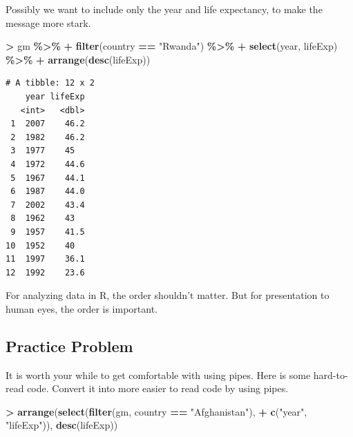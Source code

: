 \documentclass[
]{krantz}
\makeatletter
\newenvironment{Shaded}{\begin{snugshade}}{\end{snugshade}}
\newcommand{\KeywordTok}[1]{\textcolor[rgb]{0.27,0.27,0.27}{\textbf{#1}}}
\newcommand{\NormalTok}[1]{#1}
\newcommand{\OperatorTok}[1]{\textcolor[rgb]{0.43,0.43,0.43}{\textbf{#1}}}
\newcommand{\StringTok}[1]{\textcolor[rgb]{0.5,0.5,0.5}{#1}}
\newenvironment{kframe}{%
\medskip{}
\setlength{\fboxsep}{.8em}
 \def\at@end@of@kframe{}%
 \ifinner\ifhmode%
  \def\at@end@of@kframe{\end{minipage}}%
  \begin{minipage}{\columnwidth}%
 \fi\fi%
 \def\FrameCommand##1{\hskip\@totalleftmargin \hskip-\fboxsep
 \colorbox{shadecolor}{##1}\hskip-\fboxsep
     \hskip-\linewidth \hskip-\@totalleftmargin \hskip\columnwidth}%
 \MakeFramed {\advance\hsize-\width
   \@totalleftmargin\z@ \linewidth\hsize
   \@setminipage}}%
 {\par\unskip\endMakeFramed%
 \at@end@of@kframe}
\renewenvironment{Shaded}{\begin{kframe}}{\end{kframe}}
\makeatother
\begin{document}
Possibly we want to include only the year and life expectancy, to make the message more stark.

\begin{Shaded}
\begin{Highlighting}[]
\OperatorTok{\textgreater{}}\StringTok{ }\NormalTok{gm }\OperatorTok{\%\textgreater{}\%}\StringTok{ }
\OperatorTok{+}\StringTok{   }\KeywordTok{filter}\NormalTok{(country }\OperatorTok{==}\StringTok{ "Rwanda"}\NormalTok{) }\OperatorTok{\%\textgreater{}\%}\StringTok{ }
\OperatorTok{+}\StringTok{   }\KeywordTok{select}\NormalTok{(year, lifeExp) }\OperatorTok{\%\textgreater{}\%}\StringTok{ }
\OperatorTok{+}\StringTok{   }\KeywordTok{arrange}\NormalTok{(}\KeywordTok{desc}\NormalTok{(lifeExp)) }
\end{Highlighting}
\end{Shaded}

\begin{verbatim}
# A tibble: 12 x 2
    year lifeExp
   <int>   <dbl>
 1  2007    46.2
 2  1982    46.2
 3  1977    45  
 4  1972    44.6
 5  1967    44.1
 6  1987    44.0
 7  2002    43.4
 8  1962    43  
 9  1957    41.5
10  1952    40  
11  1997    36.1
12  1992    23.6
\end{verbatim}

For analyzing data in R, the order shouldn't matter. But for presentation to human eyes, the order is important.

\hypertarget{practice-problem-9}{%
\subsection{Practice Problem}\label{practice-problem-9}}

It is worth your while to get comfortable with using pipes. Here is some hard-to-read code. Convert it into more easier to read code by using pipes.

\begin{Shaded}
\begin{Highlighting}[]
\OperatorTok{\textgreater{}}\StringTok{ }\KeywordTok{arrange}\NormalTok{(}\KeywordTok{select}\NormalTok{(}\KeywordTok{filter}\NormalTok{(gm, country }\OperatorTok{==}\StringTok{ "Afghanistan"}\NormalTok{), }
\OperatorTok{+}\StringTok{                }\KeywordTok{c}\NormalTok{(}\StringTok{"year"}\NormalTok{, }\StringTok{"lifeExp"}\NormalTok{)), }\KeywordTok{desc}\NormalTok{(lifeExp))}
\end{Highlighting}
\end{Shaded}
\end{document}
